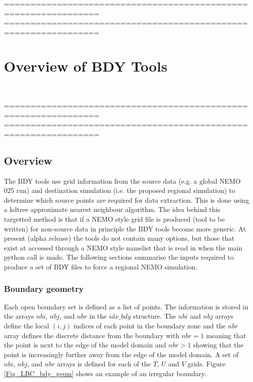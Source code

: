 %
================================================================
%
================================================================
\chapter{Overview of BDY Tools }
\label{setup}

$\ $\newline    %



%
\noindent ================================================================
%
================================================================

\section{Overview}


The BDY tools use grid information from the source data (e.g. a global NEMO 025
run) and destination simulation (i.e. the proposed regional simulation) to determine which source points are
required for data extraction. This is done using a kdtree approximate nearest
neighbour algorithm. The idea behind this targetted method is that if a NEMO
style grid file is produced (tool to be written) for non-\NEMO source data in principle the BDY tools 
become more generic. At present (alpha release) the tools do not contain many
options, but those that exist at accessed through a NEMO style namelist that is read in
when the main python call is made. The following sections summarise the inputs 
required to produce a set of BDY files to force a regional NEMO simulation.

\subsection{Boundary geometry}
\label{BDY_geometry}

Each open boundary set is defined as a list of points. The
information
is stored in the arrays $nbi$, $nbj$, and $nbr$ in the
$idx\_bdy$
structure.  The $nbi$ and $nbj$ arrays
define the local $(i,j)$ indices of each point in the boundary
zone
and the $nbr$ array defines the discrete distance from the
boundary
with $nbr=1$ meaning that the point is next to the edge of the
model domain and $nbr>1$ showing that the point is increasingly
further away from the edge of the model domain. A set of $nbi$,
$nbj$,
and $nbr$ arrays is defined for each of the $T$, $U$ and $V$
grids. Figure \ref{Fig_LBC_bdy_geom} shows an example of an
irregular
boundary. 

